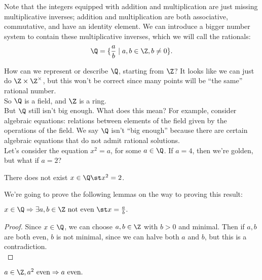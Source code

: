 \documentclass{notes}
\begin{document}
Note that the integers equipped with addition and multiplication are just missing multiplicative inverses;
addition and multiplication are both associative, commutative, and have an identity element. We can
introduce a bigger number system to contain these multiplicative inverses, which we will call the rationals:
$$\Q = \{\frac{a}{b} \mid a, b \in \Z, b \neq 0\}.$$ 

How can we represent or describe $\Q$, starting from $\Z$? It looks like we can just do $\Z\times\Z^{\times}$, 
but this won't be correct since many points will be ``the same'' rational number. \\


So $\Q$ is a field, and $\Z$ is a ring. \\

But $\Q$ still isn't big enough. What does this mean? For example, consider algebraic equations: relations
between elements of the field given by the operations of the field. We say $\Q$ isn't ``big enough'' 
because there are certain algebraic equations that do not admit rational solutions. \\

Let's consider the equation $x^2 = a$, for some $a\in\Q$. If $a = 4$, then we're golden, but what if 
$a = 2$? \\

\begin{theorem}
  There does not exist $x\in\Q \st x^2 = 2$. \\
\end{theorem}

We're going to prove the following lemmas on the way to proving this result:

\begin{lemma}
  $x\in\Q \Rightarrow \exists a,b\in\Z \text{ not even } \st x = \frac{a}{b}.$
\end{lemma}

\begin{proof}
  Since $x\in\Q$, we can choose $a,b\in\Z$ with $b > 0$ and minimal. Then if $a,b$ are both even, $b$ is
  not minimal, since we can halve both $a$ and $b$, but this is a contradiction. \\
\end{proof}

\begin{lemma}
  $a\in\Z, a^2 \text{ even} \Rightarrow a \text{ even}.$
\end{lemma}
\end{document}
